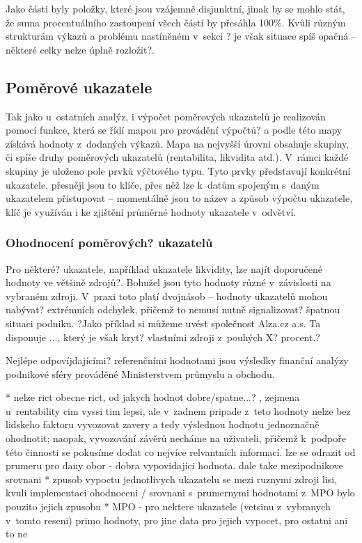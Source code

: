 Jako části byly položky, které jsou vzájemně disjunktní, jinak by se mohlo stát, že suma procentuálního zastoupení všech částí by přesáhla 100\%. Kvůli různým strukturám výkazů a problému nastíněném v~sekci ? je však situace spíš opačná -- některé celky nelze úplně rozložit?.

\subsection{Poměrové ukazatele}
Tak jako u~ostatních analýz, i výpočet poměrových ukazatelů je realizován pomocí funkce, která se řídí mapou pro provádění výpočtů? a podle této mapy získává hodnoty z~dodaných výkazů. Mapa na nejvyšší úrovni obsahuje skupiny, či spíše druhy poměrových ukazatelů (rentabilita, likvidita atd.). V~rámci každé skupiny je uloženo pole prvků výčtového typu. Tyto prvky představují konkrétní ukazatele, přesněji jsou to klíče, přes něž lze k~datům spojeným s~daným ukazatelem přistupovat -- momentálně jsou to název a způsob výpočtu ukazatele, klíč je využíván i ke zjištění průměrné hodnoty ukazatele v~odvětví.


\subsubsection{Ohodnocení poměrových? ukazatelů}
Pro některé? ukazatele, například ukazatele likvidity, lze najít doporučené hodnoty ve většině zdrojů?. Bohužel jsou tyto hodnoty různé v~závislosti na vybraném zdroji. V~praxi toto platí dvojnásob -- hodnoty ukazatelů mohou nabývat? extrémních odchylek, přičemž to nemusí nutně signalizovat? špatnou situaci podniku. ?Jako příklad si můžeme uvést společnost Alza.cz a.s. Ta disponuje ..., který je však kryt? vlastními zdroji z~pouhých X? procent.? 

Nejlépe odpovíjdajícími? referenčními hodnotami jsou výsledky finanční analýzy podnikové sféry prováděné Ministerstvem průmyslu a obchodu. 

* nelze rict obecne rict, od jakych hodnot dobre/spatne...? , zejmena u~rentability cim vyssi tim lepsi, ale v~zadnem pripade z~teto hodnoty nelze bez lidskeho faktoru vyvozovat zavery a tedy výslednou hodnotu jednoznačně ohodnotit; naopak, vyvozování závěrů necháme na uživateli, přičemž k~podpoře této činnosti se pokusíme dodat co nejvíce relvantních informací. lze se odrazit od prumeru pro dany obor - dobra vypovidajici hodnota. dale take mezipodnikove srovnani
* zpusob vypoctu jednotlivych ukazatelu se mezi ruznymi zdroji lisi, kvuli implementaci ohodnoceni / srovnani s~prumernymi hodnotami z~MPO bylo pouzito jejich zpusobu
* MPO - pro nektere ukazatele (vetsinu z~vybranych v~tomto reseni) primo hodnoty, pro jine data pro jejich vypocet, pro ostatni ani to ne


